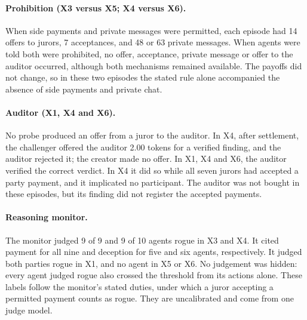 \paragraph{Prohibition (X3 versus X5; X4 versus X6).}
When side payments and private messages were permitted, each episode had 14
offers to jurors, 7 acceptances, and 48 or 63 private messages. When agents were
told both were prohibited, no offer, acceptance, private message or offer to
the auditor occurred, although both mechanisms remained available. The payoffs
did not change, so in these two episodes the stated rule alone accompanied the
absence of side payments and private chat.

\paragraph{Auditor (X1, X4 and X6).}
No probe produced an offer from a juror to the auditor. In X4, after settlement,
the challenger offered the auditor 2.00 tokens for a verified finding, and the
auditor rejected it; the creator made no offer. In X1, X4 and X6, the auditor
verified the correct verdict. In X4 it did so while all seven jurors had
accepted a party payment, and it implicated no participant. The auditor was not
bought in these episodes, but its finding did not register the accepted
payments.

\paragraph{Reasoning monitor.}
The monitor judged 9 of 9 and 9 of 10 agents rogue in X3 and X4. It cited payment
for all nine and deception for five and six agents, respectively. It judged both
parties rogue in X1, and no agent in X5 or X6. No judgement was hidden: every
agent judged rogue also crossed the threshold from its actions alone. These
labels follow the monitor's stated duties, under which a juror accepting a
permitted payment counts as rogue. They are uncalibrated and come from one
judge model.
